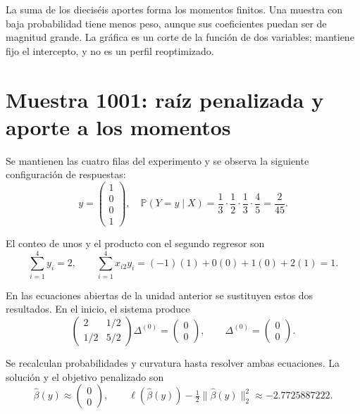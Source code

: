 \documentclass[11pt,a4paper]{article}
\newcommand{\Prob}{\mathbb P}
\begin{document}
La suma de los dieciséis aportes forma los momentos finitos.
Una muestra con baja probabilidad tiene menos peso,
aunque sus coeficientes puedan ser de magnitud grande.
La gráfica es un corte de la función de dos variables;
mantiene fijo el intercepto, y no es un perfil reoptimizado.
\endgroup

\clearpage
\section{Muestra 1001: raíz penalizada y aporte a los momentos}\label{logit134}
\begingroup\small
\setlength{\abovedisplayskip}{4pt}\setlength{\belowdisplayskip}{4pt}
Se mantienen las cuatro filas del experimento y se observa
la siguiente configuración de respuestas:
\[
y=\begin{pmatrix}1\\0\\0\\1\end{pmatrix},\quad \Prob(Y=y\mid X)=\frac{1}{3}\cdot\frac{1}{2}\cdot\frac{1}{3}\cdot\frac{4}{5}=\frac{2}{45}.
\]

El conteo de unos y el producto con el segundo regresor son
\[
\sum_{i=1}^4 y_i=2,\qquad\sum_{i=1}^4x_{i2}y_i=(-1)(1)+0(0)+1(0)+2(1)=1.
\]

En las ecuaciones abiertas de la unidad anterior se sustituyen
estos dos resultados. En el inicio, el sistema produce
\[
\begin{pmatrix}2&1/2\\1/2&5/2\end{pmatrix}\Delta^{(0)}=\begin{pmatrix}0\\0\end{pmatrix},\qquad\Delta^{(0)}=\begin{pmatrix}0\\0\end{pmatrix}.
\]

Se recalculan probabilidades y curvatura hasta resolver
ambas ecuaciones. La solución y el objetivo penalizado son
\[
\widehat\beta(y)\approx\begin{pmatrix}0\\0\end{pmatrix},\qquad \ell(\widehat\beta(y))-\tfrac12\|\widehat\beta(y)\|_2^2\approx-2.7725887222.
\]
\end{document}
